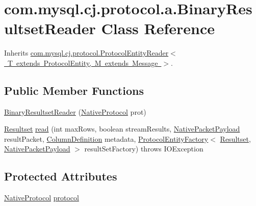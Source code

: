 \hypertarget{classcom_1_1mysql_1_1cj_1_1protocol_1_1a_1_1_binary_resultset_reader}{}\section{com.\+mysql.\+cj.\+protocol.\+a.\+Binary\+Resultset\+Reader Class Reference}
\label{classcom_1_1mysql_1_1cj_1_1protocol_1_1a_1_1_binary_resultset_reader}


Inherits \mbox{\hyperlink{interfacecom_1_1mysql_1_1cj_1_1protocol_1_1_protocol_entity_reader}{com.\+mysql.\+cj.\+protocol.\+Protocol\+Entity\+Reader$<$ T extends Protocol\+Entity, M extends Message $>$}}.

\subsection*{Public Member Functions}
\begin{DoxyCompactItemize}
\item 
\mbox{\hyperlink{classcom_1_1mysql_1_1cj_1_1protocol_1_1a_1_1_binary_resultset_reader_ae07fe98123b2431ae583c3435f7f1d69}{Binary\+Resultset\+Reader}} (\mbox{\hyperlink{classcom_1_1mysql_1_1cj_1_1protocol_1_1a_1_1_native_protocol}{Native\+Protocol}} prot)
\item 
\mbox{\hyperlink{interfacecom_1_1mysql_1_1cj_1_1protocol_1_1_resultset}{Resultset}} \mbox{\hyperlink{classcom_1_1mysql_1_1cj_1_1protocol_1_1a_1_1_binary_resultset_reader_afa8678031f1a28a920214b2402f2abde}{read}} (int max\+Rows, boolean stream\+Results, \mbox{\hyperlink{classcom_1_1mysql_1_1cj_1_1protocol_1_1a_1_1_native_packet_payload}{Native\+Packet\+Payload}} result\+Packet, \mbox{\hyperlink{interfacecom_1_1mysql_1_1cj_1_1protocol_1_1_column_definition}{Column\+Definition}} metadata, \mbox{\hyperlink{interfacecom_1_1mysql_1_1cj_1_1protocol_1_1_protocol_entity_factory}{Protocol\+Entity\+Factory}}$<$ \mbox{\hyperlink{interfacecom_1_1mysql_1_1cj_1_1protocol_1_1_resultset}{Resultset}}, \mbox{\hyperlink{classcom_1_1mysql_1_1cj_1_1protocol_1_1a_1_1_native_packet_payload}{Native\+Packet\+Payload}} $>$ result\+Set\+Factory)  throws I\+O\+Exception 
\end{DoxyCompactItemize}
\subsection*{Protected Attributes}
\begin{DoxyCompactItemize}
\item 
\mbox{\hyperlink{classcom_1_1mysql_1_1cj_1_1protocol_1_1a_1_1_native_protocol}{Native\+Protocol}} \mbox{\hyperlink{classcom_1_1mysql_1_1cj_1_1protocol_1_1a_1_1_binary_resultset_reader_a959b57d9bb0eb1092dc414611100a121}{protocol}}
\end{DoxyCompactItemize}


